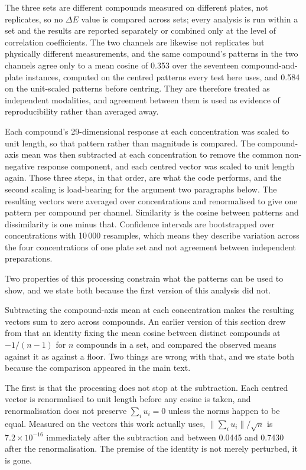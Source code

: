 \documentclass[journal=jacsat,manuscript=suppinfo,margin=1in]{achemso}
\begin{document}


The three sets are different compounds measured on different plates, not
replicates, so no $\Delta E$ value is compared across sets; every analysis is run
within a set and the results are reported separately or combined only at the
level of correlation coefficients. The two channels are likewise not replicates
but physically different measurements, and the same compound's patterns in the
two channels agree only to a mean cosine of 0.353 over the seventeen
compound-and-plate instances, computed on the centred patterns every test here
uses, and 0.584 on the unit-scaled patterns before centring. They are therefore
treated as independent modalities, and agreement between them is used as
evidence of reproducibility rather than averaged away.

Each compound's 29-dimensional response at each concentration was scaled to unit
length, so that pattern rather than magnitude is compared. The compound-axis mean
was then subtracted at each concentration to remove the common non-negative
response component, and each centred vector was scaled to unit length again.
Those three steps, in that order, are what the code performs, and the second
scaling is load-bearing for the argument two paragraphs below. The resulting
vectors were averaged over concentrations and renormalised to give one pattern
per compound per channel. Similarity is the
cosine between patterns and dissimilarity is one minus that. Confidence intervals
are bootstrapped over concentrations with 10\,000 resamples, which means they
describe variation across the four concentrations of one plate set and not
agreement between independent preparations.

Two properties of this processing constrain what the patterns can be used to
show, and we state both because the first version of this analysis did not.

Subtracting the compound-axis mean at each concentration makes the resulting
vectors sum to zero across compounds. An earlier version of this section drew
from that an identity fixing the mean cosine between distinct compounds at
$-1/(n-1)$ for $n$ compounds in a set, and compared the observed means against
it as against a floor. Two things are wrong with that, and we state both
because the comparison appeared in the main text.

The first is that the processing does not stop at the subtraction. Each centred
vector is renormalised to unit length before any cosine is taken, and
renormalisation does not preserve $\sum_i u_i = 0$ unless the norms happen to
be equal. Measured on the vectors this work actually uses,
$\lVert\sum_i u_i\rVert/\sqrt{n}$ is $7.2\times10^{-16}$ immediately after
the subtraction and between 0.0445 and 0.7430 after the renormalisation. The
premise of the identity is not merely perturbed, it is gone.
\end{document}
